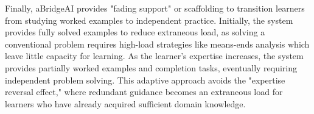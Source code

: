 Finally, aBridgeAI provides "fading support" or scaffolding to transition learners from studying worked examples to independent practice. Initially, the system provides fully solved examples to reduce extraneous load, as solving a conventional problem requires high-load strategies like means-ends analysis which leave little capacity for learning. As the learner's expertise increases, the system provides partially worked examples and completion tasks, eventually requiring independent problem solving. This adaptive approach avoids the "expertise reversal effect," where redundant guidance becomes an extraneous load for learners who have already acquired sufficient domain knowledge\cite{Renkl2003}.
